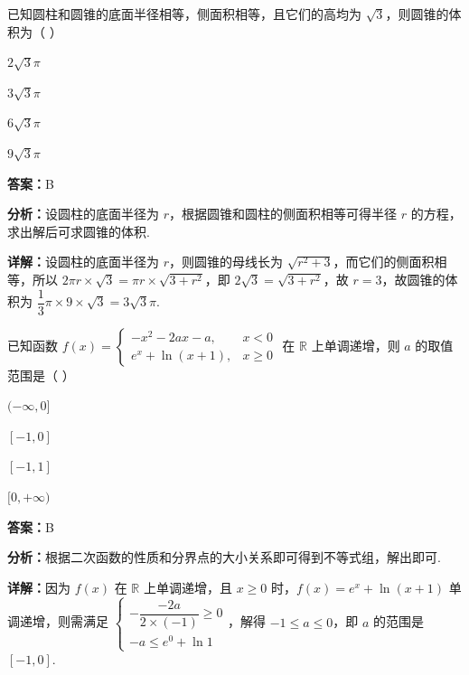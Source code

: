 \begin{question}[points=5]
已知圆柱和圆锥的底面半径相等，侧面积相等，且它们的高均为 $\sqrt{3}$，则圆锥的体积为（ ）
\begin{choices}
  \item $2\sqrt{3}\pi$
  \item $3\sqrt{3}\pi$
  \item $6\sqrt{3}\pi$
  \item $9\sqrt{3}\pi$
\end{choices}
\begin{solution}
\textbf{答案：}B

\textbf{分析：}设圆柱的底面半径为 $r$，根据圆锥和圆柱的侧面积相等可得半径 $r$ 的方程，求出解后可求圆锥的体积.

\textbf{详解：}设圆柱的底面半径为 $r$，则圆锥的母线长为 $\sqrt{r^2+3}$，而它们的侧面积相等，所以 $2\pi r\times\sqrt{3}=\pi r\times\sqrt{3+r^2}$，即 $2\sqrt{3}=\sqrt{3+r^2}$，故 $r=3$，故圆锥的体积为 $\dfrac{1}{3}\pi\times 9\times\sqrt{3}=3\sqrt{3}\pi$.
\end{solution}
\end{question}

\begin{question}[points=5]
已知函数 $f(x)=\begin{cases}-x^2-2ax-a, & x<0 \\ e^x+\ln(x+1), & x\ge 0\end{cases}$ 在 $\mathbb{R}$ 上单调递增，则 $a$ 的取值范围是（ ）
\begin{choices}
  \item $(-\infty,0]$
  \item $[-1,0]$
  \item $[-1,1]$
  \item $[0,+\infty)$
\end{choices}
\begin{solution}
\textbf{答案：}B

\textbf{分析：}根据二次函数的性质和分界点的大小关系即可得到不等式组，解出即可.

\textbf{详解：}因为 $f(x)$ 在 $\mathbb{R}$ 上单调递增，且 $x\ge 0$ 时，$f(x)=e^x+\ln(x+1)$ 单调递增，则需满足 $\begin{cases} -\dfrac{-2a}{2\times(-1)}\ge 0 \\ -a\le e^0+\ln1 \end{cases}$，解得 $-1\le a\le 0$，即 $a$ 的范围是 $[-1,0]$.
\end{solution}
\end{question}

